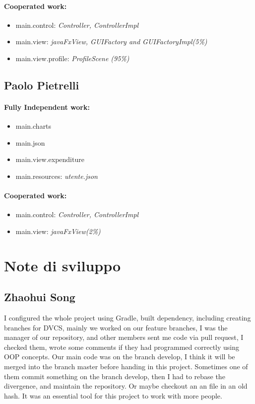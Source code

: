 \documentclass[a4paper,12pt]{report}
\begin{document}
\paragraph*{Cooperated work:}
\begin{itemize}
    \item main.control: \textit{Controller, ControllerImpl}
    \item main.view: \textit{javaFxView, GUIFactory and GUIFactoryImpl(5\%)}
    \item main.view.profile: \textit{ProfileScene (95\%)}
\end{itemize}

\subsection{Paolo Pietrelli}
\paragraph*{Fully Independent work:}
\begin{itemize}
    \item main.charts
    \item main.json
    \item main.view.expenditure
    \item main.resources: \textit{utente.json}
\end{itemize}
\paragraph*{Cooperated work:}
\begin{itemize}
    \item main.control: \textit{Controller, ControllerImpl}
    \item main.view: \textit{javaFxView(2\%)}
\end{itemize}

\section{Note di sviluppo}

\subsection{Zhaohui Song}
I configured the whole project using Gradle, built dependency, including creating branches for DVCS, 
%
mainly we worked on our feature branches, I was the manager of our repository, and other members sent me code via pull request, I checked them, wrote some comments if they had programmed correctly using OOP concepts. 
%
Our main code was on the branch develop, I think it will be merged into the branch master before handing in this project.
%
Sometimes one of them commit something on the branch develop, then I had to rebase the divergence, and maintain the repository. Or maybe checkout an an file in an old hash. It was an essential tool for this project to work with more people. 
\end{document}

